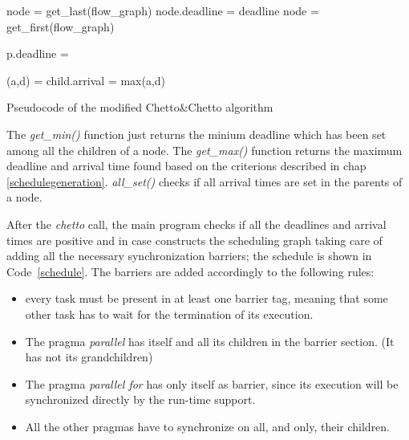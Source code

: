 \documentclass[a4paper,12pt,oneside]{book}
\begin{document}
\begin{algorithm}[H]
\begin{algorithmic}
\State node = get\_last(flow\_graph)
\State node.deadline = deadline
\State {}
\State node = get\_first(flow\_graph)
\State {}
\EndFunction

\end{algorithmic}

\begin{algorithmic}
\State p.deadline =  
\EndFor
{}
\State {}
\EndFor
\EndIf
\EndFunction

\end{algorithmic}

\begin{algorithmic}
\State (a,d) =  
\State child.arrival = max(a,d)
\EndIf
\State {}
\EndFor
\EndIf
\EndFunction

\end{algorithmic}
\caption{Pseudocode of the modified Chetto\&Chetto algorithm }
\end{algorithm}

The \emph{get\_min()} function just returns the minium deadline which has been set among all the children of a node. The \emph{get\_max()} function returns the maximum deadline and arrival time found based on the criterions described in chap \ref{schedulegeneration}. \emph{all\_set()} checks if all arrival times are set in the parents of a node.

After the \emph{chetto} call, the main program checks if all the deadlines and arrival times are positive and in case constructs the scheduling graph taking care of adding all the necessary synchronization barriers; the schedule is shown in Code~\ref{schedule}. The barriers are added accordingly to the following rules:
\begin{itemize}
\item {every task must be present in at least one barrier tag, meaning that some other task has to wait for the termination of its execution.}
\item {The pragma \emph{parallel} has itself and all its children in the barrier section. (It has not its grandchildren)}
\item {The pragma \emph{parallel for} has only itself as barrier, since its execution will be synchronized directly by the run-time support.}
\item {All the other pragmas have to synchronize on all, and only, their children.}

\end{itemize}
\end{document}
